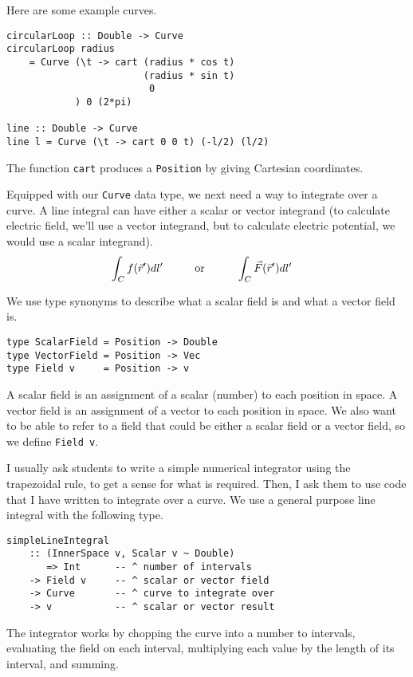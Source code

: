 \documentclass[11pt]{article}
\begin{document}
Here are some example curves.
\begin{verbatim}
circularLoop :: Double -> Curve
circularLoop radius
    = Curve (\t -> cart (radius * cos t)
                        (radius * sin t)
                         0
            ) 0 (2*pi)

line :: Double -> Curve
line l = Curve (\t -> cart 0 0 t) (-l/2) (l/2)
\end{verbatim}
The function \verb|cart| produces a \verb|Position| by giving Cartesian coordinates.

Equipped with our \verb|Curve| data type, we next need a way to integrate over a curve.
A line integral can have either a scalar or vector integrand
(to calculate electric field, we'll use a vector integrand, but to
calculate electric potential, we would use a scalar integrand).
\begin{align*}
\int_C f(\vec{r}') dl' \hspace{10mm} & \textrm{or} \hspace{10mm} \int_C \vec{F}(\vec{r}') dl'
\end{align*}

We use type synonyms to describe what a scalar field is and
what a vector field is.
\begin{verbatim}
type ScalarField = Position -> Double
type VectorField = Position -> Vec
type Field v     = Position -> v
\end{verbatim}
A scalar field is an assignment of a scalar (number) to each position in space.
A vector field is an assignment of a vector to each position in space.
We also want to be able to refer to a field that could be either
a scalar field or a vector field, so we define \verb|Field v|.

I usually ask students to write a simple numerical integrator
using the trapezoidal rule, to get a sense for what is required.
Then, I ask them to use code that I have written to integrate over a curve.
We use a general purpose line integral with the following type.

\begin{verbatim}
simpleLineIntegral
    :: (InnerSpace v, Scalar v ~ Double)
       => Int      -- ^ number of intervals
    -> Field v     -- ^ scalar or vector field
    -> Curve       -- ^ curve to integrate over
    -> v           -- ^ scalar or vector result
\end{verbatim}
The integrator works by chopping the curve into
a number to intervals, evaluating the field on each interval,
multiplying each value by the length of its interval, and summing.
\end{document}
